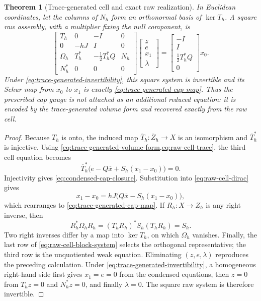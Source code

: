 \documentclass[11pt,a4paper]{article}
\newtheorem{theorem}{Theorem}[section]
\begin{document}
\begin{theorem}[Trace-generated cell and exact raw realization]
In Euclidean coordinates, let the columns of \(N_h\) form an orthonormal
basis of \(\ker T_h\).  A square raw assembly, with a multiplier fixing
the null component, is
\begin{equation}\label{eq:raw-cell-block-system}
 \begin{bmatrix}
 T_h&0&-I&0\\
 0&-hJ&I&0\\
 \Omega_h&T_h^*&-\tfrac12T_h^*Q&N_h\\
 N_h^*&0&0&0
 \end{bmatrix}
 \begin{bmatrix}z\\e\\x_1\\\lambda\end{bmatrix}
 =
 \begin{bmatrix}-I\\I\\\tfrac12T_h^*Q\\0\end{bmatrix}x_0.
\end{equation}
Under \cref{eq:trace-generated-invertibility}, this square system is
invertible and its Schur map from \(x_0\) to \(x_1\) is exactly
\cref{eq:trace-generated-cap-map}.  Thus the prescribed cap gauge is not
attached as an additional reduced equation: it is encoded by the
trace-generated volume form and recovered exactly from the raw cell.
\end{theorem}

\begin{proof}
Because \(T_h\) is onto, the induced map
\(\overline T_h:\overline Z_h\to X\) is an isomorphism and
\(\overline T_h^*\) is injective.  Using
\cref{eq:trace-generated-volume-form,eq:raw-cell-trace}, the third cell
equation becomes
\[
 \overline T_h^*
 \bigl(e-Q\overline x+S_h(x_1-x_0)\bigr)=0.
\]
Injectivity gives \cref{eq:condensed-cap-closure}.  Substitution into
\cref{eq:raw-cell-dirac} gives
\[
 x_1-x_0=hJ\bigl(Q\overline x-S_h(x_1-x_0)\bigr),
\]
which rearranges to \cref{eq:trace-generated-cap-map}.  If
\(R_h:X\to Z_h\) is any right inverse, then
\[
 R_h^*\Omega_hR_h
 =(T_hR_h)^*S_h(T_hR_h)=S_h.
\]
Two right inverses differ by a map into \(\ker T_h\), on which
\(\Omega_h\) vanishes.  Finally, the last row of
\cref{eq:raw-cell-block-system} selects the orthogonal representative;
the third row is the unquotiented weak equation.  Eliminating
\((z,e,\lambda)\) reproduces the preceding calculation.  Under
\cref{eq:trace-generated-invertibility}, a homogeneous right-hand side
first gives \(x_1=e=0\) from the condensed equations, then \(z=0\) from
\(T_hz=0\) and \(N_h^*z=0\), and finally \(\lambda=0\).  The square raw
system is therefore invertible.
\end{proof}
\end{document}
